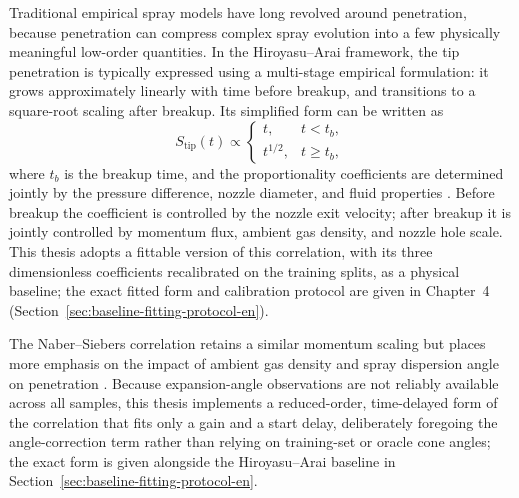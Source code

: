 Traditional empirical spray models have long revolved around penetration, because penetration can compress complex spray evolution into a few physically meaningful low-order quantities.
In the Hiroyasu--Arai framework, the tip penetration is typically expressed using a multi-stage empirical formulation: it grows approximately linearly with time before breakup, and transitions to a square-root scaling after breakup. Its simplified form can be written as
\[
S_{\mathrm{tip}}(t)\propto
\begin{cases}
t, & t<t_b,\\
t^{1/2}, & t\ge t_b,
\end{cases}
\]
where \(t_b\) is the breakup time, and the proportionality coefficients are determined jointly by the pressure difference, nozzle diameter, and fluid properties \cite{HiroyasuArai1990}. Before breakup the coefficient is controlled by the nozzle exit velocity; after breakup it is jointly controlled by momentum flux, ambient gas density, and nozzle hole scale. This thesis adopts a fittable version of this correlation, with its three dimensionless coefficients recalibrated on the training splits, as a physical baseline; the exact fitted form and calibration protocol are given in Chapter~4 (Section~\ref{sec:baseline-fitting-protocol-en}).

The Naber--Siebers correlation retains a similar momentum scaling but places more emphasis on the impact of ambient gas density and spray dispersion angle on penetration \cite{NaberSiebers1996}. Because expansion-angle observations are not reliably available across all samples, this thesis implements a reduced-order, time-delayed form of the correlation that fits only a gain and a start delay, deliberately foregoing the angle-correction term rather than relying on training-set or oracle cone angles; the exact form is given alongside the Hiroyasu--Arai baseline in Section~\ref{sec:baseline-fitting-protocol-en}.

